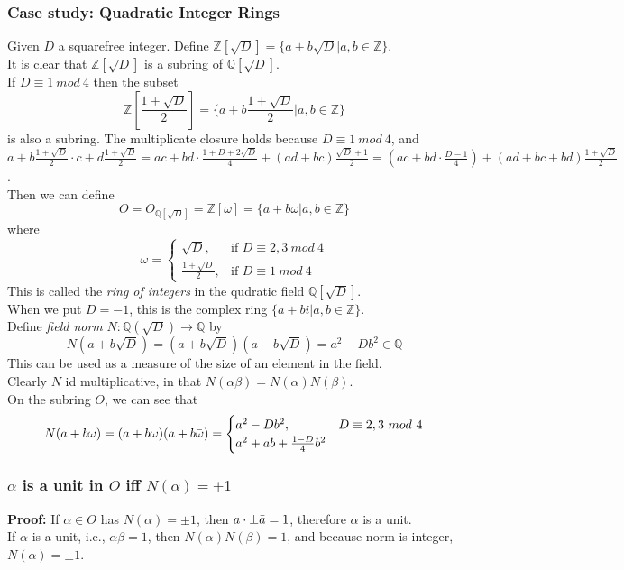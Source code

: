 \documentclass{article}
\begin{document}
\subsubsection{Case study: Quadratic Integer Rings}
Given $D$ a squarefree integer. Define $\mathbb{Z}[\sqrt{D}] = \{a+b\sqrt{D}|a,b \in \mathbb{Z}\}$.\\
It is clear that $\mathbb{Z}[\sqrt{D}]$ is a subring of $\mathbb{Q}[\sqrt{D}]$.\\
If $D \equiv 1\ mod\ 4$ then the subset
\begin{equation*}
    \mathbb{Z}[\frac{1+\sqrt{D}}{2}] = \{a+b\frac{1+\sqrt{D}}{2}|a,b \in \mathbb{Z}\}
\end{equation*}
is also a subring. The multiplicate closure holds because $D \equiv 1\ mod\ 4$, and $a+b\frac{1+\sqrt{D}}{2} \cdot c+d\frac{1+\sqrt{D}}{2} = ac+bd \cdot \frac{1+D+2\sqrt{D}}{4} + (ad+bc)\frac{\sqrt{D}+1}{2} = (ac+bd\cdot \frac{D-1}{4}) + (ad+bc+bd)\frac{1+\sqrt{D}}{2}$.\\
Then we can define
\begin{equation*}
    O = O_{\mathbb{Q}[\sqrt{D}]} = \mathbb{Z}[\omega]=\{a+b\omega|a,b\in \mathbb{Z}\}
\end{equation*}
where
\begin{equation*}
    \omega = \begin{cases}
    \sqrt{D},& \textrm{if } D \equiv 2,3\ mod\ 4\\
    \frac{1+\sqrt{D}}{2}, & \textrm{if } D \equiv 1\ mod\ 4
    \end{cases}
\end{equation*}
This is called the \textit{ring of integers} in the qudratic field $\mathbb{Q}[\sqrt{D}]$.\\
When we put $D=-1$, this is the complex ring $\{a+bi|a,b \in \mathbb{Z}\}$.\\
Define \textit{field norm} $N:\mathbb{Q}(\sqrt{D})\rightarrow \mathbb{Q}$ by
\begin{equation*}
    N(a+b\sqrt{D}) = (a+b\sqrt{D})(a-b\sqrt{D}) = a^2 - Db^2 \in \mathbb{Q}
\end{equation*}
This can be used as a measure of the size of an element in the field.\\
Clearly $N$ id multiplicative, in that $N(\alpha\beta) = N(\alpha)N(\beta)$.\\
On the subring $O$, we can see that
\begin{equation*}
    N(a+b\omega) = (a+b\omega)(a+b\Bar{\omega}) = \begin{cases}
    a^2 - Db^2,& D\equiv 2,3\ mod\ 4\\
    a^2+ab+\frac{1-D}{4}b^2
    \end{cases}
\end{equation*}
\subsubsection{$\alpha$ is a unit in $O$ iff $N(\alpha)=\pm 1$}
\textbf{Proof:}
If $\alpha \in O$ has $N(\alpha) = \pm 1$, then $a \cdot \pm\Bar{a} = 1$, therefore $\alpha$ is a unit.\\
If $\alpha$ is a unit, i.e., $\alpha\beta = 1$, then $N(\alpha)N(\beta) = 1$, and because norm is integer, $N(\alpha) = \pm1$.
\end{document}
